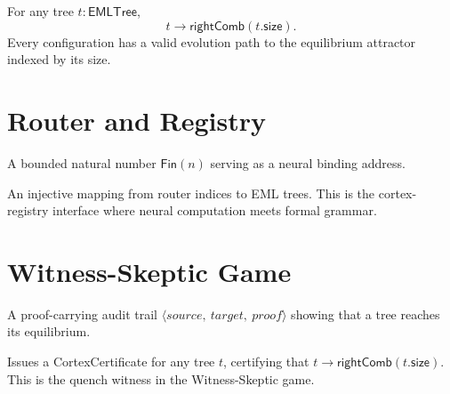\begin{theorem}
\label{thm:contracts_to_rightComb}
\leanok
{}
For any tree $t : \mathsf{EMLTree}$,
\[
t \longrightarrow \mathsf{rightComb}(t.\mathsf{size}).
\]
Every configuration has a valid evolution path to the equilibrium attractor indexed by its size.
\end{theorem}

\section{Router and Registry}

\begin{definition}
\label{def:router}
\leanok
A bounded natural number $\mathsf{Fin}(n)$ serving as a neural binding address.
\end{definition}

\begin{definition}
\label{def:registry}
\leanok
{}
An injective mapping from router indices to EML trees. This is the cortex-registry interface where neural computation meets formal grammar.
\end{definition}

\section{Witness-Skeptic Game}

\begin{definition}
\label{def:certificate}
\leanok
{}
A proof-carrying audit trail $\langle source,\ target,\ proof \rangle$ showing that a tree reaches its equilibrium.
\end{definition}

\begin{definition}[Certify]
\label{def:certify}
\leanok
{}
Issues a \textsf{CortexCertificate} for any tree $t$, certifying that $t \to \mathsf{rightComb}(t.\mathsf{size})$.
This is the quench witness in the Witness-Skeptic game.
\end{definition}

